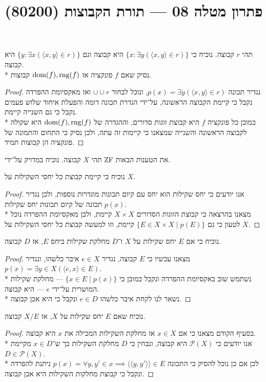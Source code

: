 
\title{פתרון מטלה 08 --- תורת הקבוצות (80200)}

\DeclareMathOperator\dom{dom}
\DeclareMathOperator\add{Add}

\maketitle
\maketitleprint{}

\Question{}
תהי $r$ קבוצה. נוכיח כי $\{ x : \exists y (\langle x, y \rangle \in r )\}$ היא קבוצה וגם $\{ y : \exists x(\langle x, y \rangle \in r )\}$ היא קבוצה. \\*
נסיק שאם $f$ פונקציה אז $\dom(f), \rng(f)$ קבוצות.
\begin{proof}
	נגדיר תכונה $p(x) = \exists y (\langle x, y \rangle \in r)$, ונוכל לבחור $\cup \cup r$ ואז מאקסיומת ההפרדה נקבל כי קיימת הקבוצה הראשונה, על־ידי הגדרת תכונה דומה והפעלת איחוד שלוש פעמים נקבל כי גם השנייה קיימת. \\*
	כמובן כל פונקציה $f$ היא קבוצת זוגות סדורים, וההגדרה של $\dom(f), \rng(f)$ היא שקולה לקבוצה הראשונה והשנייה שמצאנו כי קיימות זה עתה, ולכן נסיק כי התחום והתמונה של פונקציה הן קבוצות תמיד.
\end{proof}

\Question{}
תהי $X$ קבוצה. נוכיח במדויק על־ידי ZF את הטענות הבאות.

\Subquestion{}
נוכיח כי קיימת קבוצת כל יחסי השקילות על $X$.
\begin{proof}
	אנו יודעים כי יחס שקילות הוא יחס עם קיום תכונות מוגדרות נוספות, ולכן נגדיר $p(x)$ תכונה של קיום תכונות יחס שקילות. \\*
	מצאנו בהרצאה כי קבוצת הזוגות הסדורים $X \times X$ קיימת, ולכן מאקסיומת ההפרדה נוכל לטעון כי גם $\{ E \in X \times X \mid p(E) \}$ קיימת, וזו למעשה קבוצת כל יחסי השקילות על $X$.
\end{proof}

\Subquestion{}
נוכיח כי אם $E$ יחס שקילות על $X$ ו־$D$ מחלקת שקילות ביחס $E$, אז $D$ קבוצה.
\begin{proof}
	מצאנו עכשיו כי $E$ קבוצה, נגדיר $e \in X$ איבר כלשהו, ונגדיר $p(x) = \exists y \in X (\langle e, x \rangle \in E)$. \\*
	נשתמש שוב באקסיומת ההפרדה ונקבל כמובן כי $\{ x \in E \mid p(x) \}$ --- מחלקת שקילות המושרית על־ידי $e$ --- היא קבוצה. \\*
	נשאר לנו לקחת איבר כלשהו $e \in D$ ונקבל כי היא אכן קבוצה.
\end{proof}

\Subquestion{}
נוכיח שאם $E$ יחס שקילות על $X$, אז $X / E$ קבוצה.
\begin{proof}
	בסעיף הקודם מצאנו כי אם $x \in X$ אז מחלקת השקילות המכילה את $x$ היא קבוצה. \\*
	אנו יודעים כי $\mathcal{P}(X)$ היא קבוצה, ונבחין כי $D$ מחלקת השקילות כך ש־$x \in D$ מקיימת $D \in \mathcal{P}(X)$. \\*
	לכן אם כן נוכל להסיק כי התכונה $p(x) = \forall y, y' \in x \implies \langle \langle y, y' \rangle \rangle \in E$ ניתנת להפרדה ונקבל כי קבוצת מחלקות השקילות היא אכן קבוצה.
\end{proof}


